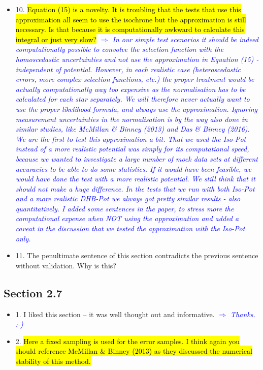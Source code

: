 \documentclass[10pt,a4paper]{article}
\newcommand{\Comment}[1]{\textsl{\textcolor{Blue}{$\Longrightarrow$ {#1}}}}
\begin{document}
\begin{itemize}
\item 10. \hl{Equation (15) is a novelty. It is troubling that the tests that use this approximation all seem to use the isochrone but the approximation is still necessary. Is that because it is computationally awkward to calculate this integral or just very slow?} \Comment{In our simple test scenarios it should be indeed computationally possible to convolve the selection function with the homoscedastic uncertainties and not use the approximation in Equation (15) - independent of potential. However, in each realistic case (heteroscedastic errors, more complex selection functions, etc.) the proper treatment would be actually computationally way too expensive as the normalisation has to be calculated for each star separately. We will therefore never actually want to use the proper likelihood formula, and always use the approximation. Ignoring measurement uncertainties in the normalisation is by the way also done in similar studies, like McMillan \& Binney (2013) and Das \& Binney (2016). We are the first to test this approximation a bit. That we used the Iso-Pot instead of a more realistic potential was simply for its computational speed, because we wanted to investigate a large number of mock data sets at different accuracies to be able to do some statistics. If it would have been feasible, we would have done the test with a more realistic potential. We still think that it should not make a huge difference. In the tests that we run with both Iso-Pot and a more realistic DHB-Pot we always got pretty similar results - also quantitatively. I added some sentences in the paper, to stress more the computational expense when NOT using the approximation and added a caveat in the discussion that we tested the approximation with the Iso-Pot only.}
\item 11. The penultimate sentence of this section contradicts the previous sentence without validation. Why is this?
\end{itemize}

\subsection{Section 2.7}
\begin{itemize}
\item 1. I liked this section -- it was well thought out and informative. \Comment{Thanks. :-)}
\item 2. \hl{Here a fixed sampling is used for the error samples. I think again you should reference McMillan \& Binney (2013) as they discussed the numerical stability of this method.}
\end{itemize}
\end{document}
